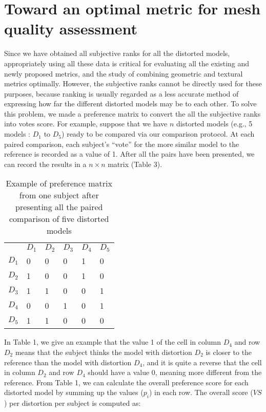 \section{Toward an optimal metric for mesh quality assessment}
Since we have obtained all subjective ranks for all the distorted models, appropriately using all these data is critical for evaluating all the existing and newly proposed metrics, and the study of combining geometric and textural metrics optimally. However, the subjective ranks cannot be directly used for these purposes, because ranking is usually regarded as a less accurate method of expressing how far the different distorted models may be to each other.  To solve this problem, we made a preference matrix \cite{Ledda_2005} to convert the all the subjective ranks into votes score. For example, suppose that we have $n$ distorted models (e.g., 5 models : $D_1$ to $D_5$) ready to be compared via our comparison protocol.   At each paired comparison, each subject’s “vote” for the more similar model to the reference is recorded as a value of 1. After all the pairs have been presented, we can record the results in a $n \times n$ matrix (Table 3).
\begin{table}[]
\centering
\caption{Example of preference matrix from one subject after presenting all the paired comparison of five distorted models }
\label{my-label}
\begin{tabular}{llllll}
            & $D_1$ & $D_2$ & $D_3$ & $D_4$ & $D_5$ \\
$D_1$ & 0           & 0           & 0           & 1           & 0           \\
$D_2$ & 1           & 0           & 0           & 1           & 0           \\
$D_3$ & 1           & 1           & 0           & 0           & 1           \\
$D_4$ & 0           & 0           & 1           & 0           & 1           \\
$D_5$ & 1           & 1           & 0           & 0           & 0          
\end{tabular}
\end{table}

In Table 1, we give an example that the value 1 of the cell in column $D_4$ and row $D_2$ means that the subject thinks the model with distortion $D_2$ is closer to the reference than the model with distortion $D_4$, and it is quite a reverse that the cell in column $D_2$ and row $D_4$ should have a value 0, meaning more different from the reference. From Table 1, we can calculate the overall preference score for each distorted model by summing up the values ($p_i$) in each row. The overall score ($VS$) per distortion per subject is computed as: